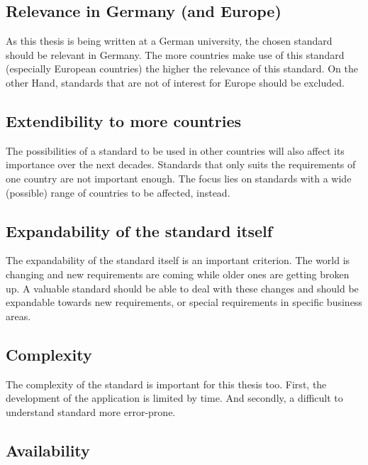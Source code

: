 \subsection{Relevance in Germany (and Europe)}
\label{sec2.2.2}
As this thesis is being written at a German university, the chosen standard should be relevant in Germany. The more countries make use of this standard (especially European countries) the higher the relevance of this standard. On the other Hand, standards that are not of interest for Europe should be excluded.

\subsection{Extendibility to more countries}
\label{sec2.2.3}
The possibilities of a standard to be used in other countries will also affect its importance over the next decades. Standards that only suits the requirements of one country are not important enough. The focus lies on standards with a wide (possible) range of countries to be affected, instead.

\subsection{Expandability of the standard itself}
\label{sec2.2.4}
The expandability of the standard itself is an important criterion. The world is changing and new requirements are coming while older ones are getting broken up. A valuable standard should be able to deal with these changes and should be expandable towards new requirements, or special requirements in specific business areas.

\subsection{Complexity}
\label{sec2.2.5}
The complexity of the standard is important for this thesis too. First, the development of the application is limited by time. And secondly, a difficult to understand standard more error-prone.

\subsection{Availability}
\label{sec2.2.6}

